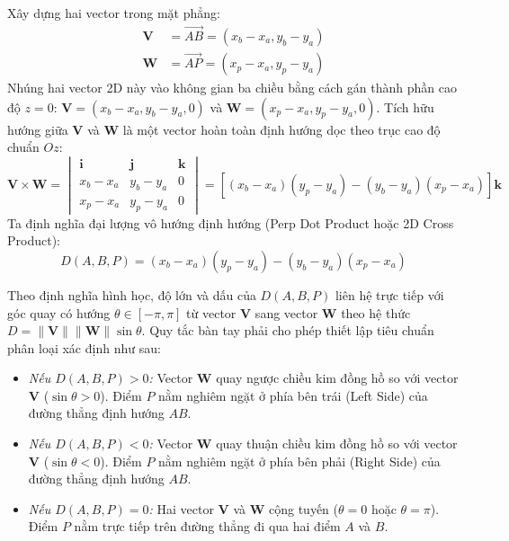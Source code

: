 Xây dựng hai vector trong mặt phẳng:
\begin{align}
\mathbf{V} &= \vec{AB} = (x_b - x_a, y_b - y_a) \\
\mathbf{W} &= \vec{AP} = (x_p - x_a, y_p - y_a)
\end{align}
Nhúng hai vector 2D này vào không gian ba chiều bằng cách gán thành phần cao độ $z = 0$: $\mathbf{V} = (x_b - x_a, y_b - y_a, 0)$ và $\mathbf{W} = (x_p - x_a, y_p - y_a, 0)$. Tích hữu hướng giữa $\mathbf{V}$ và $\mathbf{W}$ là một vector hoàn toàn định hướng dọc theo trục cao độ chuẩn $Oz$:
\begin{equation}
\mathbf{V} \times \mathbf{W} = \begin{vmatrix} \mathbf{i} & \mathbf{j} & \mathbf{k} \\ x_b - x_a & y_b - y_a & 0 \\ x_p - x_a & y_p - y_a & 0 \end{vmatrix} = \left[ (x_b - x_a)(y_p - y_a) - (y_b - y_a)(x_p - x_a) \right] \mathbf{k}
\end{equation}
Ta định nghĩa đại lượng vô hướng định hướng (Perp Dot Product hoặc 2D Cross Product):
\begin{equation}
\label{eq:perp_dot_product}
D(A, B, P) = (x_b - x_a)(y_p - y_a) - (y_b - y_a)(x_p - x_a)
\end{equation}

Theo định nghĩa hình học, độ lớn và dấu của $D(A, B, P)$ liên hệ trực tiếp với góc quay có hướng $\theta \in [-\pi, \pi]$ từ vector $\mathbf{V}$ sang vector $\mathbf{W}$ theo hệ thức $D = \|\mathbf{V}\| \|\mathbf{W}\| \sin\theta$. Quy tắc bàn tay phải cho phép thiết lập tiêu chuẩn phân loại xác định như sau:
\begin{itemize}
    \item \textit{Nếu $D(A, B, P) > 0$:} Vector $\mathbf{W}$ quay ngược chiều kim đồng hồ so với vector $\mathbf{V}$ ($\sin\theta > 0$). Điểm $P$ nằm nghiêm ngặt ở phía bên trái (Left Side) của đường thẳng định hướng $AB$.
    \item \textit{Nếu $D(A, B, P) < 0$:} Vector $\mathbf{W}$ quay thuận chiều kim đồng hồ so với vector $\mathbf{V}$ ($\sin\theta < 0$). Điểm $P$ nằm nghiêm ngặt ở phía bên phải (Right Side) của đường thẳng định hướng $AB$.
    \item \textit{Nếu $D(A, B, P) = 0$:} Hai vector $\mathbf{V}$ và $\mathbf{W}$ cộng tuyến ($\theta = 0$ hoặc $\theta = \pi$). Điểm $P$ nằm trực tiếp trên đường thẳng đi qua hai điểm $A$ và $B$.
\end{itemize}

